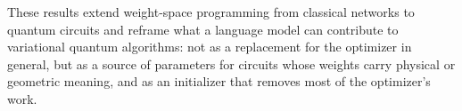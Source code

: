 These results extend weight-space programming from classical networks to quantum circuits and reframe what a language model can contribute to variational quantum algorithms: not as a replacement for the optimizer in general, but as a source of parameters for circuits whose weights carry physical or geometric meaning, and as an initializer that removes most of the optimizer's work.
